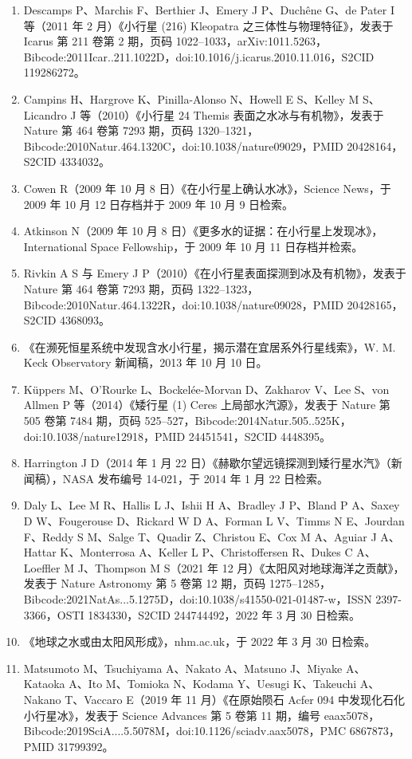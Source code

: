 \begin{enumerate}
\item Descamps P、Marchis F、Berthier J、Emery J P、Duchêne G、de Pater I 等（2011 年 2 月）《小行星 (216) Kleopatra 之三体性与物理特征》，发表于 Icarus 第 211 卷第 2 期，页码 1022–1033，arXiv:1011.5263，Bibcode:2011Icar..211.1022D，doi:10.1016/j.icarus.2010.11.016，S2CID 119286272。
\item Campins H、Hargrove K、Pinilla-Alonso N、Howell E S、Kelley M S、Licandro J 等（2010）《小行星 24 Themis 表面之水冰与有机物》，发表于 Nature 第 464 卷第 7293 期，页码 1320–1321，Bibcode:2010Natur.464.1320C，doi:10.1038/nature09029，PMID 20428164，S2CID 4334032。
\item Cowen R（2009 年 10 月 8 日）《在小行星上确认水冰》，Science News，于 2009 年 10 月 12 日存档并于 2009 年 10 月 9 日检索。
\item Atkinson N（2009 年 10 月 8 日）《更多水的证据：在小行星上发现冰》，International Space Fellowship，于 2009 年 10 月 11 日存档并检索。
\item Rivkin A S 与 Emery J P（2010）《在小行星表面探测到冰及有机物》，发表于 Nature 第 464 卷第 7293 期，页码 1322–1323，Bibcode:2010Natur.464.1322R，doi:10.1038/nature09028，PMID 20428165，S2CID 4368093。
\item 《在濒死恒星系统中发现含水小行星，揭示潜在宜居系外行星线索》，W. M. Keck Observatory 新闻稿，2013 年 10 月 10 日。
\item Küppers M、O'Rourke L、Bockelée-Morvan D、Zakharov V、Lee S、von Allmen P 等（2014）《矮行星 (1) Ceres 上局部水汽源》，发表于 Nature 第 505 卷第 7484 期，页码 525–527，Bibcode:2014Natur.505..525K，doi:10.1038/nature12918，PMID 24451541，S2CID 4448395。
\item Harrington J D（2014 年 1 月 22 日）《赫歇尔望远镜探测到矮行星水汽》（新闻稿），NASA 发布编号 14-021，于 2014 年 1 月 22 日检索。
\item Daly L、Lee M R、Hallis L J、Ishii H A、Bradley J P、Bland P A、Saxey D W、Fougerouse D、Rickard W D A、Forman L V、Timms N E、Jourdan F、Reddy S M、Salge T、Quadir Z、Christou E、Cox M A、Aguiar J A、Hattar K、Monterrosa A、Keller L P、Christoffersen R、Dukes C A、Loeffler M J、Thompson M S（2021 年 12 月）《太阳风对地球海洋之贡献》，发表于 Nature Astronomy 第 5 卷第 12 期，页码 1275–1285，Bibcode:2021NatAs...5.1275D，doi:10.1038/s41550-021-01487-w，ISSN 2397-3366，OSTI 1834330，S2CID 244744492，2022 年 3 月 30 日检索。
\item 《地球之水或由太阳风形成》，nhm.ac.uk，于 2022 年 3 月 30 日检索。
\item Matsumoto M、Tsuchiyama A、Nakato A、Matsuno J、Miyake A、Kataoka A、Ito M、Tomioka N、Kodama Y、Uesugi K、Takeuchi A、Nakano T、Vaccaro E（2019 年 11 月）《在原始陨石 Acfer 094 中发现化石化小行星冰》，发表于 Science Advances 第 5 卷第 11 期，编号 eaax5078，Bibcode:2019SciA....5.5078M，doi:10.1126/sciadv.aax5078，PMC 6867873，PMID 31799392。

\end{enumerate}

